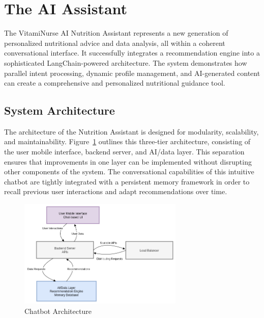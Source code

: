 \section{The AI Assistant}
The VitamiNurse AI Nutrition Assistant represents a new generation of personalized nutritional advice and data analysis, all within a coherent conversational interface. It successfully integrates a recommendation engine into a sophisticated LangChain-powered architecture. The system demonstrates how parallel intent processing, dynamic profile management, and AI-generated content can create a comprehensive and personalized nutritional guidance tool.

\subsection{System Architecture}
The architecture of the Nutrition Assistant is designed for modularity, scalability, and maintainability. Figure~\ref{fig:chatbot Architect} outlines this three-tier architecture, consisting of the user mobile interface, backend server, and AI/data layer.
 This separation ensures that improvements in one layer can be implemented without disrupting other components of the system. The conversational capabilities of this intuitive chatbot are tightly integrated with a persistent memory framework in order to recall previous user interactions and adapt recommendations over time.  
 \begin{center}
    \begin{figure}[H]
    \includegraphics[width=0.7\textwidth]{images/Chatbot_arch.png}
    \caption{Chatbot Architecture} 
    \label{fig:chatbot Architect}
\end{figure}
\end{center}

